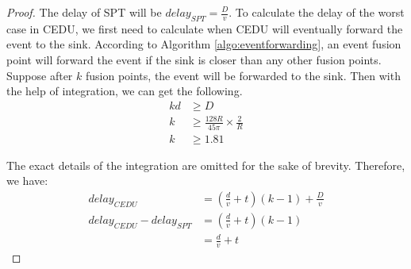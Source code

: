 \begin{proof}
The delay of SPT will be \(delay_{SPT}=\frac{D}{v}\). To calculate the delay of the worst case in CEDU, we first need to calculate when CEDU will eventually forward the event to the sink. According to Algorithm \ref{algo:eventforwarding}, an event fusion point will forward the event if the sink is closer than any other fusion points. Suppose after \(k\) fusion points, the event will be forwarded to the sink. Then with the help of integration, we can get the following.
\begin{align*}
kd&\geq D\\
k&\geq \frac{128R}{45\pi}\times\frac{2}{R}\\
k&\geq 1.81
\end{align*}

The exact details of the integration are omitted for the sake of brevity. Therefore, we have:
\begin{align*}
delay_{CEDU}&=(\frac{d}{v}+t)(k-1)+\frac{D}{v}\\
delay_{CEDU}-delay_{SPT}&=(\frac{d}{v}+t)(k-1)\\
&=\frac{d}{v}+t
\end{align*}
\end{proof}